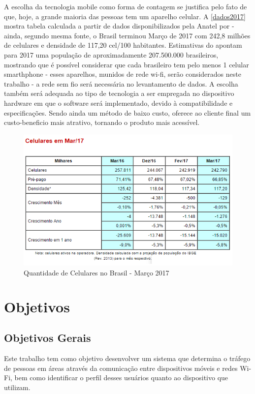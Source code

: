 A escolha da tecnologia mobile como forma de contagem se justifica pelo fato de que, hoje, a grande maioria das pessoas tem um aparelho celular. A \autoref{dados2017} mostra tabela calculada a partir de dados disponibilizados pela Anatel por  - ainda, segundo mesma fonte, o Brasil terminou Março de 2017 com 242,8 milhões de celulares e densidade de 117,20 cel/100 habitantes. Estimativas do  apontam para 2017 uma população de aproximadamente 207.500.000 brasileiros, mostrando que é possível considerar que cada brasileiro tem pelo menos 1 celular smarthphone - esses aparelhos, munidos de rede wi-fi, serão considerados neste trabalho - a rede sem fio será necessária no levantamento de dados. A escolha também será adequada ao tipo de tecnologia a ser empregada no dispositivo hardware em que o software será implementado, devido à compatibilidade e especificações. Sendo ainda um método de baixo custo, oferece ao cliente final um custo-beneficio mais atrativo, tornando o produto mais acessível.

\begin{figure}[htb]
  \caption{\label{dados2017}Quantidade de Celulares no Brasil - Março 2017}
  \begin{center}
    \includegraphics[width=1.0\textwidth]{img/dados2017.png}
  \end{center}
\end{figure}


\section{Objetivos}
\label{objetivos}

\subsection{Objetivos Gerais}
Este trabalho tem como objetivo desenvolver um sistema que determina o tráfego de pessoas em áreas através da comunicação
entre dispositivos móveis e redes Wi-Fi, bem como identificar o perfil desses usuários quanto ao dispositivo que utilizam.

